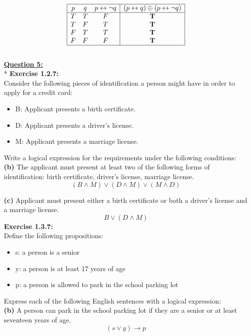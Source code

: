 \documentclass[12pt, letterpaper, twoside]{article}
\begin{document}
\begin{displaymath}
\begin{array}{|c c c|c|c|}
\hline
p & q & p \leftrightarrow \neg{q} & (p \leftrightarrow q) \oplus (p \leftrightarrow \neg{q})\\ 
\hline 
T & T & F & \textbf{T}\\
T & F & T & \textbf{T}\\
F & T & T & \textbf{T}\\
F & F & F & \textbf{T}\\
\hline
\end{array}
\end{displaymath}\\
\newpage
\noindent \underline{\textbf{Question 5:}}\\*
\textbf{Exercise 1.2.7:}\\ 
Consider the following pieces of identification a person might have in order to apply for a credit card:
\begin{itemize}[noitemsep,topsep=0pt]
\item B: Applicant presents a birth certificate.
\item D: Applicant presents a driver's license.
\item M: Applicant presents a marriage license.
\end{itemize}
Write a logical expression for the requirements under the following conditions:\\

\noindent \textbf{(b)} The applicant must present at least two of the following forms of identification: birth certificate, driver's license, marriage license.
\[(B \land M) \lor (D \land  M) \lor (M \land D)	\]

\noindent \textbf{(c)} Applicant must present either a birth certificate or both a driver's license and a marriage license.
\[B \lor (D \land M)\]
\break
\noindent \textbf{Exercise 1.3.7:}\\
Define the following propositions:
\begin{itemize}[noitemsep,topsep=0pt]
\item s: a person is a senior
\item y: a person is at least 17 years of age
\item p: a person is allowed to park in the school parking lot
\end{itemize}
Express each of the following English sentences with a logical expression:\\

\noindent\textbf{(b)} A person can park in the school parking lot if they are a senior or at least seventeen years of age.
\[(s \lor y) \to p\]
\end{document}
